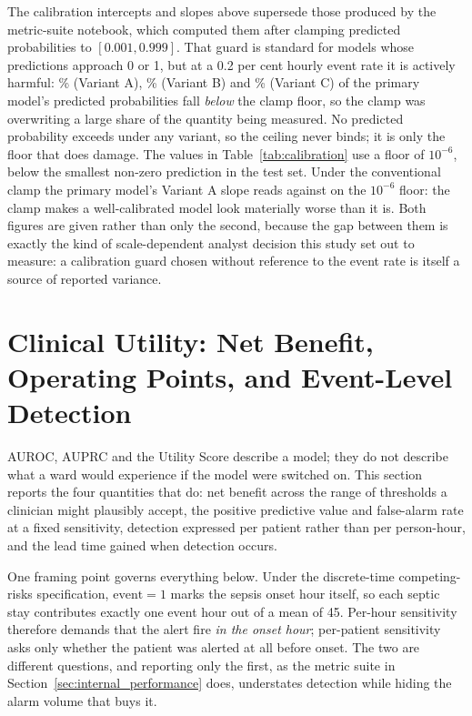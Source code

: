 The calibration intercepts and slopes above supersede those produced by the
metric-suite notebook, which computed them after clamping predicted
probabilities to $[0.001, 0.999]$. That guard is standard for models whose
predictions approach 0 or 1, but at a 0.2 per cent hourly event rate it is
actively harmful: \pcPctBelowClampPrimaryA\% (Variant A),
\pcPctBelowClampPrimaryB\% (Variant B) and \pcPctBelowClampPrimaryC\%
(Variant C) of the primary model's predicted probabilities fall \emph{below}
the clamp floor, so the clamp was overwriting a large share of the quantity
being measured. No predicted probability exceeds \pcMaxPredPrimaryC{} under any
variant, so the
ceiling never binds; it is only the floor that does damage. The
values in Table~\ref{tab:calibration} use a floor of $10^{-6}$, below the
smallest non-zero prediction in the test set. Under the conventional clamp the primary
model's Variant A slope reads \pcCalibSlopeClampedPrimaryA{} against
\pcCalibSlopePrimaryA{} on the
$10^{-6}$ floor: the clamp makes a well-calibrated model look materially
worse than it is. Both figures are given rather than only the second, because
the gap between them is exactly the kind of scale-dependent analyst decision
this study set out to measure: a calibration guard chosen without reference to
the event rate is itself a source of reported variance.



\section{Clinical Utility: Net Benefit, Operating Points, and Event-Level
    Detection}
\label{sec:clinical_utility}

AUROC, AUPRC and the Utility Score describe a model; they do not describe what
a ward would experience if the model were switched on. This section reports
the four quantities that do: net benefit across the range of thresholds a
clinician might plausibly accept, the positive predictive value and false-alarm
rate at a fixed sensitivity, detection expressed per patient rather than per
person-hour, and the lead time gained when detection occurs.

One framing point governs everything below. Under the discrete-time
competing-risks specification, $\text{event}=1$ marks the sepsis onset hour
itself, so each septic stay contributes exactly one event hour out of a mean
of 45. Per-hour sensitivity therefore demands that the alert fire \emph{in the
onset hour}; per-patient sensitivity asks only whether the patient was alerted
at all before onset. The two are different questions, and reporting only the
first, as the metric suite in Section~\ref{sec:internal_performance} does,
understates detection while hiding the alarm volume that buys it.

